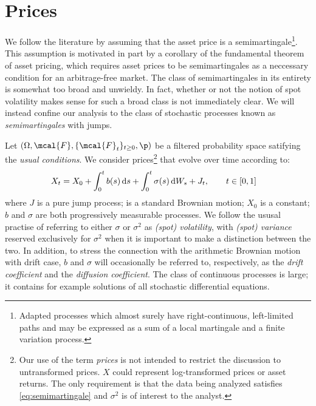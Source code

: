 
\section{Prices} \label{sec:model}
We follow the literature by assuming that the asset price is a semimartingale\footnote{Adapted processes which almost surely have  right-continuous, left-limited paths and  may be expressed as a sum of a local martingale and a finite variation process.}. This assumption is motivated in part by a corollary of  the fundamental theorem of asset pricing, which requires asset prices to be semimartingales as a neccessary   condition for an arbitrage-free market. The class of semimartingales in its entirety  is somewhat too broad and  unwieldy. In fact, whether or not the notion of spot volatility makes sense for such a broad class is not immediately clear. We will instead confine our analysis to the class of stochastic processes known as  \emph{\ito  semimartingales} with \levy jumps.


Let $(\Omega, \mcal{F}, \{\mcal{F}_t\}_{t \ge 0}, \p)$ be a filtered probability space satifying the \emph{usual conditions}. We consider prices\footnote{Our use of the term \emph{prices}  is not intended to restrict the  discussion  to untransformed prices. $X$ could  represent log-transformed prices or asset returns. The only requirement is that the data being analyzed   satisfies \eqref{eq:semimartingale} and $\sigma^2$ is of interest to the analyst.}    
 that evolve over time according to:
\begin{align}
  X_t & = X_0 + \int_0^t b(s) \D s + \int_0^t \sigma(s) \D W_s   + J_t, \qquad t \in [0,1]  
  \label{eq:semimartingale}
\end{align}
where $J$ is a pure jump \levy  process; \sbm is a standard Brownian motion;  $X_0$ is a constant;   $b$ and $\sigma$  are both progressively measurable  processes. We follow the ususal practise of referring to either $\sigma$ or $\sigma^2$  as \emph{(spot) volatility}, with \emph{(spot) variance} reserved exclusively for $\sigma^2$ when it is important to make a  distinction between the two. In addition, to stress the connection with the arithmetic Brownian motion with drift case, $b$ and $\sigma$ will occasionally be referred to, respectively, as the \emph{drift coefficient} and the \emph{diffusion coefficient}. 
 The class of continuous \ito processes is large; it contains for example   solutions of all stochastic differential equations.


